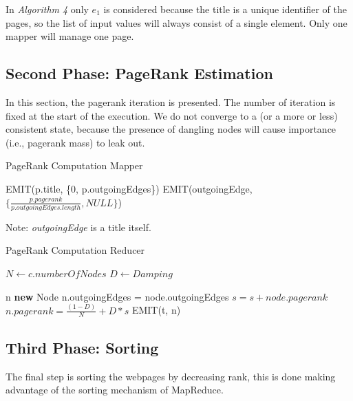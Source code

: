 \noindent In \textit{Algorithm 4} only $e_1$ is considered because the title is a unique identifier of the pages, so the list of input values will always consist of a single element. Only one mapper will manage one page.

\subsection{Second Phase: PageRank Estimation}
In this section, the pagerank iteration is presented.
\noindent The number of iteration is fixed at the start of the execution. We do not converge to a (or a more or less) consistent state, because the presence of dangling nodes will cause importance (i.e., pagerank mass) to leak out.

\begin{algorithm}
	\caption{PageRank Computation Mapper}\label{Mapper}
		\begin{algorithmic}[1]
			
			\State EMIT(p.title, \{0, p.outgoingEdges\})
			\State EMIT(outgoingEdge, $\{\frac{p.pagerank}{p.outgoingEdges.length}, NULL\}$)
			\EndFor
			\EndProcedure
	\end{algorithmic}
\end{algorithm}
Note: \textit{outgoingEdge} is a title itself.


\begin{algorithm}[H]
	\caption{PageRank Computation Reducer}\label{Reducer}
		\begin{algorithmic}[1]
				\State $N \gets c.numberOfNodes$
				\State $D \gets Damping$
			\EndProcedure
		
					\State n \textbf{new} Node
							\State n.outgoingEdges = node.outgoingEdges
						\Else
							\State $s = s + node.pagerank$
						\EndIf
					\EndFor
					\State$n.pagerank =  \frac{(1-D)}{N} + D*s$
					\State EMIT(t, n)
			\EndProcedure
	\end{algorithmic}
\end{algorithm}



\subsection{Third Phase: Sorting}
The final step is sorting the webpages by decreasing rank, this is done making advantage of the sorting mechanism of MapReduce.

